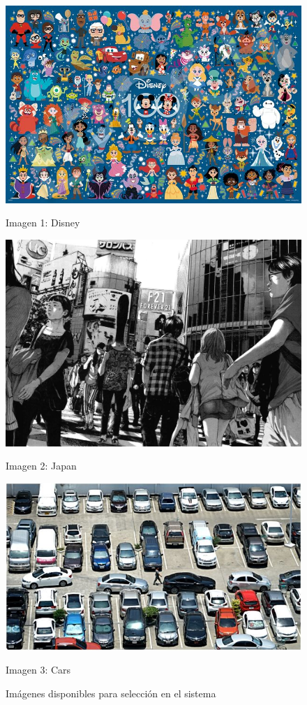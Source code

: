 \begin{figure}[ht]
	\centering
	\begin{minipage}[b]{0.3\textwidth}
		\centering
		\includegraphics[width=\textwidth]{Graphics/disney.jpeg}
		\caption*{Imagen 1: Disney}
	\end{minipage}
	\hfill
	\begin{minipage}[b]{0.3\textwidth}
		\centering
		\includegraphics[width=\textwidth]{Graphics/japan.jpg}
		\caption*{Imagen 2: Japan}
	\end{minipage}
	\hfill
	\begin{minipage}[b]{0.3\textwidth}
		\centering
		\includegraphics[width=\textwidth]{Graphics/cars.jpeg}
		\caption*{Imagen 3: Cars}
	\end{minipage}
	\caption{Imágenes disponibles para selección en el sistema}
	\label{fig:imagenes-sistema}
\end{figure}

